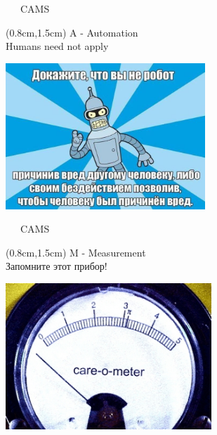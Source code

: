 \documentclass[xetex,18pt,aspectratio=43]{beamer}
\begin{document}
\begin{Large}
\begin{frame}{\ \ \ CAMS}
\begin{textblock*}{\framewidth}(0.8cm,1.5cm)
A - Automation\\
{\small Humans need not apply}
\begin{minipage}{\textwidth}
  \centering
  \includegraphics[height=5.5cm]{img/robot}
\end{minipage}
\end{textblock*}
\end{frame}

\begin{frame}{\ \ \ CAMS}
\begin{textblock*}{\framewidth}(0.8cm,1.5cm)
M - Measurement\\
{\small Запомните этот прибор!}
\begin{minipage}{\textwidth}
  \centering
  \includegraphics[height=5.5cm]{img/careometer}
\end{minipage}
\end{textblock*}
\end{frame}


\end{Large}
\end{document}
